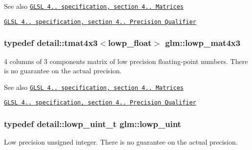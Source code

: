 \begin{DoxySeeAlso}{\-See also}
\href{http://www.opengl.org/registry/doc/GLSLangSpec.4.20.8.pdf}{\tt \-G\-L\-S\-L 4.. specification, section 4.. \-Matrices} 

\href{http://www.opengl.org/registry/doc/GLSLangSpec.4.20.8.pdf}{\tt \-G\-L\-S\-L 4.. specification, section 4.. \-Precision \-Qualifier} 
\end{DoxySeeAlso}
\hypertarget{group__core__precision_ga072d9727aa59df856b83cfc01cb131bf}{
\subsubsection[{lowp\-\_\-mat4x3}]{\setlength{\rightskip}{0pt plus 5cm}typedef detail\-::tmat4x3$<$lowp\-\_\-float$>$ {\bf glm\-::lowp\-\_\-mat4x3}}}\label{group__core__precision_ga072d9727aa59df856b83cfc01cb131bf}
4 columns of 3 components matrix of low precision floating-\/point numbers. \-There is no guarantee on the actual precision.

\begin{DoxySeeAlso}{\-See also}
\href{http://www.opengl.org/registry/doc/GLSLangSpec.4.20.8.pdf}{\tt \-G\-L\-S\-L 4.. specification, section 4.. \-Matrices} 

\href{http://www.opengl.org/registry/doc/GLSLangSpec.4.20.8.pdf}{\tt \-G\-L\-S\-L 4.. specification, section 4.. \-Precision \-Qualifier} 
\end{DoxySeeAlso}
\hypertarget{group__core__precision_ga8077c90f2c87e419ea6c273157dcc1fc}{
\subsubsection[{lowp\-\_\-uint}]{\setlength{\rightskip}{0pt plus 5cm}typedef detail\-::lowp\-\_\-uint\-\_\-t {\bf glm\-::lowp\-\_\-uint}}}\label{group__core__precision_ga8077c90f2c87e419ea6c273157dcc1fc}
\-Low precision unsigned integer. \-There is no guarantee on the actual precision.

